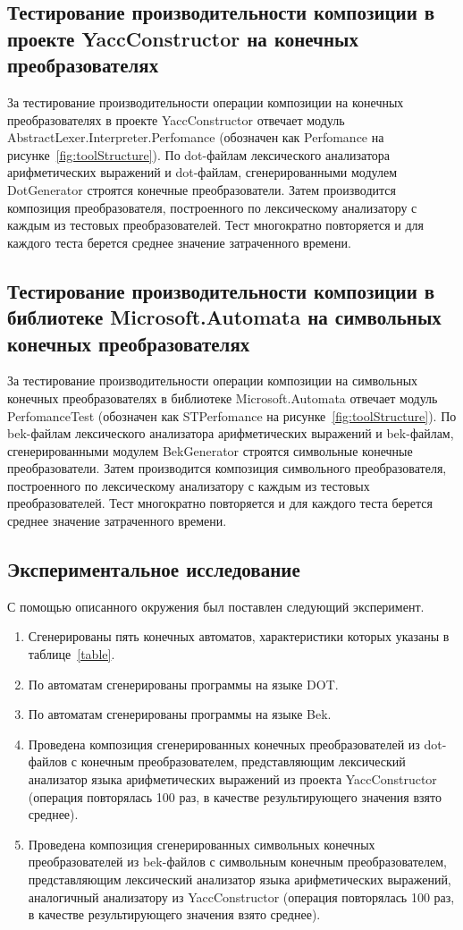 \documentclass[14pt]{matmex-diploma}
\begin{document}
\subsection{Тестирование производительности композиции в проекте YaccConstructor на конечных преобразователях}
За тестирование производительности операции композиции на конечных преобразователях в проекте YaccConstructor отвечает модуль AbstractLexer.Interpreter.Perfomance (обозначен как Perfomance на рисунке~\ref{fig:toolStructure}). По dot-файлам лексического анализатора арифметических выражений и dot-файлам, сгенерированными модулем DotGenerator строятся конечные преобразователи. Затем производится композиция преобразователя, построенного по лексическому анализатору с каждым из тестовых преобразователей. Тест многократно повторяется и для каждого теста берется среднее значение затраченного времени.

\subsection{Тестирование производительности композиции в библиотеке Microsoft.Automata на символьных конечных преобразователях}
За тестирование производительности операции композиции на символьных конечных преобразователях в библиотеке Microsoft.Automata отвечает модуль PerfomanceTest (обозначен как STPerfomance на рисунке~\ref{fig:toolStructure}). По bek-файлам лексического анализатора арифметических выражений и bek-файлам, сгенерированными модулем BekGenerator строятся символьные конечные преобразователи. Затем производится композиция символьного преобразователя, построенного по лексическому анализатору с каждым из тестовых преобразователей. Тест многократно повторяется и для каждого теста берется среднее значение затраченного времени.

\subsection{Экспериментальное исследование}
С помощью описанного окружения был поставлен следующий эксперимент.

\begin{enumerate}
\item Сгенерированы пять конечных автоматов, характеристики которых указаны в таблице~\ref{table}.
\item По автоматам сгенерированы программы на языке DOT.
\item По автоматам сгенерированы программы на языке Bek.
\item Проведена композиция сгенерированных конечных преобразователей из dot-файлов с конечным преобразователем, представляющим лексический анализатор языка арифметических выражений из проекта YaccConstructor (операция повторялась 100 раз, в качестве результирующего значения взято среднее).
\item Проведена композиция сгенерированных символьных конечных преобразователей из bek-файлов с символьным конечным преобразователем, представляющим лексический анализатор языка арифметических выражений, аналогичный анализатору из YaccConstructor (операция повторялась 100 раз, в качестве результирующего значения взято среднее).
\end{enumerate}
\end{document}
